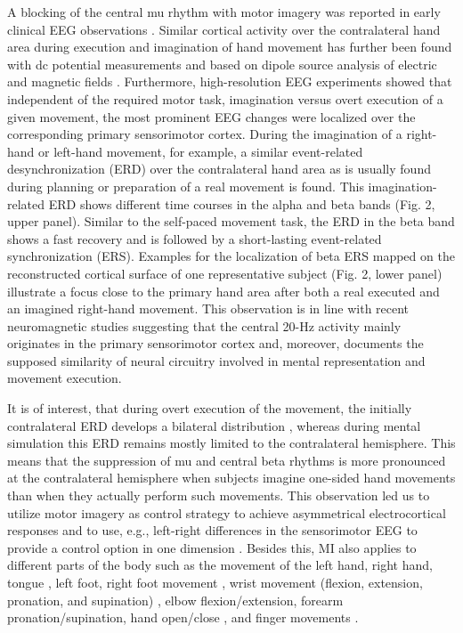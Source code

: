 \documentclass[journal,twocolumn]{IEEEtran}
\begin{document}
A blocking of the central mu rhythm with motor imagery was reported in early clinical EEG observations \cite{gastaut1952etude}. Similar cortical activity over the contralateral hand area during execution and imagination of hand movement has further been found with dc potential measurements \cite{beisteiner1995mental} and based on dipole source analysis of electric and magnetic fields \cite{lang1996electric}. Furthermore, high-resolution EEG experiments \cite{pfurtscheller1997motor} showed that independent of the required motor task, imagination versus overt execution of a given movement, the most prominent EEG changes were localized over the corresponding primary sensorimotor cortex. During the imagination of a right-hand or left-hand movement, for example, a similar event-related desynchronization (ERD) over the contralateral hand area as is usually found during planning or preparation of a real movement is found. This imagination-related ERD shows different time courses in the alpha and beta bands (Fig. 2, upper panel). Similar to the self-paced movement task, the ERD in the beta band shows a fast recovery and is followed by a short-lasting event-related synchronization (ERS). Examples for the localization of beta ERS mapped on the reconstructed cortical surface of one representative subject (Fig. 2, lower panel) illustrate a focus close to the primary hand area after both a real executed and an imagined right-hand movement. This observation is in line with recent neuromagnetic studies suggesting that the central 20-Hz activity mainly originates in the primary sensorimotor cortex \cite{salmelin1995functional} and, moreover, documents the supposed similarity of neural circuitry involved in mental representation and movement execution.

It is of interest, that during overt execution of the movement, the initially contralateral ERD develops a bilateral distribution \cite{toro1994event}, whereas during mental simulation this ERD remains mostly limited to the contralateral hemisphere. This means that the suppression of mu and central beta rhythms is more pronounced at the contralateral hemisphere when subjects imagine one-sided hand movements \cite{pfurtscheller1997motor} than when they actually perform such movements. This observation led us to utilize motor imagery as control strategy to achieve asymmetrical electrocortical responses and to use, e.g., left-right differences in the sensorimotor EEG to provide a control option in one dimension \cite{neuper1999enhancement}.
Besides this, MI also applies to different parts of the body such as the movement of the left hand, right hand, tongue \cite{qiao2019deep}, left foot, right foot movement \cite{tariq2020mu}, wrist movement (flexion, extension, pronation, and supination) \cite{ma2019deep}, elbow flexion/extension, forearm pronation/supination, hand open/close \cite{mammone2020deep}, and finger movements \cite{alazrai2019deep}.
\end{document}
